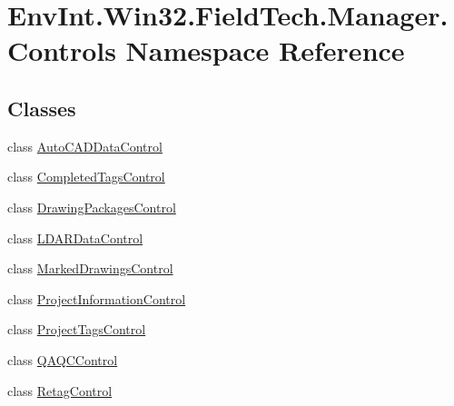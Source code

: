 \hypertarget{namespace_env_int_1_1_win32_1_1_field_tech_1_1_manager_1_1_controls}{}\section{Env\+Int.\+Win32.\+Field\+Tech.\+Manager.\+Controls Namespace Reference}
\label{namespace_env_int_1_1_win32_1_1_field_tech_1_1_manager_1_1_controls}
\subsection*{Classes}
\begin{DoxyCompactItemize}
\item 
class \hyperlink{class_env_int_1_1_win32_1_1_field_tech_1_1_manager_1_1_controls_1_1_auto_c_a_d_data_control}{Auto\+C\+A\+D\+Data\+Control}
\item 
class \hyperlink{class_env_int_1_1_win32_1_1_field_tech_1_1_manager_1_1_controls_1_1_completed_tags_control}{Completed\+Tags\+Control}
\item 
class \hyperlink{class_env_int_1_1_win32_1_1_field_tech_1_1_manager_1_1_controls_1_1_drawing_packages_control}{Drawing\+Packages\+Control}
\item 
class \hyperlink{class_env_int_1_1_win32_1_1_field_tech_1_1_manager_1_1_controls_1_1_l_d_a_r_data_control}{L\+D\+A\+R\+Data\+Control}
\item 
class \hyperlink{class_env_int_1_1_win32_1_1_field_tech_1_1_manager_1_1_controls_1_1_marked_drawings_control}{Marked\+Drawings\+Control}
\item 
class \hyperlink{class_env_int_1_1_win32_1_1_field_tech_1_1_manager_1_1_controls_1_1_project_information_control}{Project\+Information\+Control}
\item 
class \hyperlink{class_env_int_1_1_win32_1_1_field_tech_1_1_manager_1_1_controls_1_1_project_tags_control}{Project\+Tags\+Control}
\item 
class \hyperlink{class_env_int_1_1_win32_1_1_field_tech_1_1_manager_1_1_controls_1_1_q_a_q_c_control}{Q\+A\+Q\+C\+Control}
\item 
class \hyperlink{class_env_int_1_1_win32_1_1_field_tech_1_1_manager_1_1_controls_1_1_retag_control}{Retag\+Control}
\end{DoxyCompactItemize}
